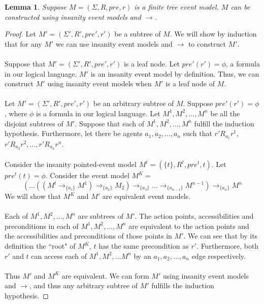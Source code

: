 \documentclass[12pt, a4paper, titlepage]{scrartcl}
\newtheorem{lemma}{Lemma}[subsection]
\numberwithin{equation}{section}
\begin{document}
\begin{lemma} \label{finTreeConstruct}
Suppose $M = (\Sigma, R, pre, r)$ is a finite tree event model.
$M$ can be constructed using insanity event models and $\to$.
\end{lemma}
\begin{proof}
Let $M' = (\Sigma', R', pre', r')$ be a subtree of $M$.
We will show by induction that for any $M'$ we can use insanity event models and $\to$ to
construct $M'$.\\
\\
Suppose that $M' = (\Sigma', R', pre', r')$ is a leaf node.
Let $pre'(r') = \phi$, a formula in our logical language.
$M'$ is an insanity event model by definition.
Thus, we can construct $M'$ using insanity event models when $M'$ is a leaf node of $M$.\\
\\
Let $M' = (\Sigma', R', pre', r')$ be an arbitrary subtree of $M$.
Suppose $pre'(r') = \phi$, where $\phi$ is a formula in our logical language.
Let $M^1, M^2, \ldots, M^n$ be all the disjoint subtrees of $M'$.
Suppose that each of $M^1, M^2, \ldots, M^n$ fulfill the induction hypothesis.
Furthermore, let there be agents $a_1, a_2, \ldots, a_n$ such that $r' R_{a_1} r^1$, $r' R_{a_2} r^2,
	\ldots, r' R_{a_n} r^n$.\\
\\
Consider the insanity pointed-event model $M^t = (\{ t \}, R^t, pre^t, t)$.
Let $pre^t(t) = \phi$.
Consider the event model $M^K = $
\[
(\ldots((M^t \to_{\{a_1\}} M ^ 1) \to_{\{a_2\}} M_2) \to_{\{a_3\}} \ldots
\to_{\{a_{n-1}\}} M^{n-1} ) \to_{\{a_n\}} M ^ n
\]
We will show that $M^K$ and $M'$ are equivalent event models.\\
\\
Each of $M^1, M^2, \ldots, M^n$ are subtrees of $M'$.
The action points, accessibilities and preconditions in each of $M^1, M^2, \ldots, M^n$ are
equivalent to the action points and the accessibilities and preconditions of those points in $M'$.
We can see that by its definition the ``root" of $M^K$, $t$ has the same precondition as $r'$.
Furthermore, both $r'$ and $t$ can access each of $M^1, M^2, \ldots M^n$ by an $a_1, a_2, \ldots, a_n$ edge
respectively.\\
\\
Thus $M'$ and $M^K$ are equivalent.
We can form $M'$ using insanity event models and $\to$, and thus any arbitrary subtree of $M'$
fulfills the induction hypothesis.
\end{proof}
\end{document}

